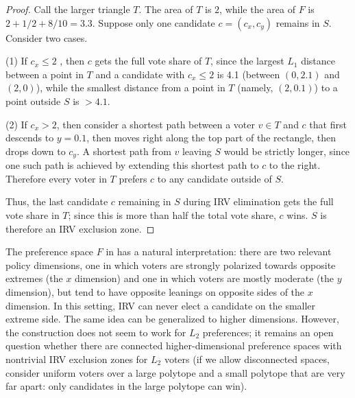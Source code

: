 \documentclass{article}
\theoremstyle{theorem}
\theoremstyle{definition}
\begin{document}
\begin{proof}
 Call the larger triangle $T$. The area of $T$ is $2$, while the area of $F$ is $2 + 1/2 + 8/10 = 3.3$.  
 Suppose only one candidate $c = (c_x, c_y)$ remains in $S$. Consider two cases. 
 
 (1) If $c_x \le 2$ , then $c$ gets the full vote share of $T$, since the largest $L_1$ distance between a point in $T$ and a candidate with $c_x\le 2$ is 4.1 (between $(0, 2.1)$ and $(2, 0)$), while the smallest distance from a point in $T$ (namely, $(2, 0.1)$) to a point outside $S$ is $> 4.1$.
 
 (2) If $c_x > 2$, then consider a shortest path between a voter $v\in T$  and $c$ that first descends to $y = 0.1$, then moves right along the top part of the rectangle, then drops down to $c_y$. A shortest path from $v$ leaving $S$ would be strictly longer, since one such path is achieved by extending this shortest path to $c$ to the right. Therefore every voter in $T$ prefers $c$ to any candidate outside of $S$.
 
 Thus, the last candidate $c$ remaining in $S$ during IRV elimination gets the full vote share in $T$; since this is more than half the total vote share, $c$ wins. $S$ is therefore an IRV exclusion zone. 
 \end{proof}

The preference space $F$ in  has a natural interpretation: there are two relevant policy dimensions, one in which voters are strongly polarized towards opposite extremes (the $x$ dimension) and one in which voters are mostly moderate (the $y$ dimension), but tend to have opposite leanings on opposite sides of the $x$ dimension.  In this setting, IRV can never elect a candidate on the smaller extreme side. The same idea can be generalized to higher dimensions. However, the construction does not seem to work for $L_2$ preferences; it remains an open question whether there are connected higher-dimensional preference spaces with nontrivial IRV exclusion zones for $L_2$ voters (if we allow disconnected spaces, consider uniform voters over a large polytope and a small polytope that are very far apart: only candidates in the large polytope can win). 
\end{document}
